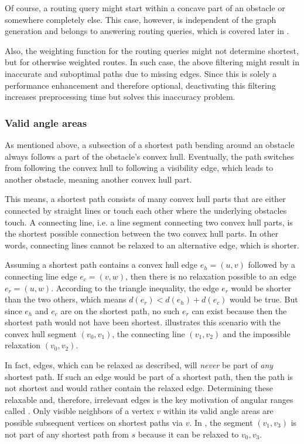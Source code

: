 			Of course, a routing query might start within a concave part of an obstacle or somewhere completely else.
			This case, however, is independent of the graph generation and belongs to answering routing queries, which is covered later in .
			
			Also, the weighting function for the routing queries might not determine shortest, but for otherwise weighted routes.
			In such case, the above filtering might result in inaccurate and suboptimal paths due to missing edges.
			Since this is solely a performance enhancement and therefore optional, deactivating this filtering increases preprocessing time but solves this inaccuracy problem.
						
		\subsubsection{Valid angle areas}
		\label{subsubsec:valid-angle-areas}
			
			As mentioned above, a subsection of a shortest path bending around an obstacle always follows a part of the obstacle's convex hull.
			Eventually, the path switches from following the convex hull to following a visibility edge, which leads to another obstacle, meaning another convex hull part.
			
			This means, a shortest path consists of many convex hull parts that are either connected by straight lines or touch each other where the underlying obstacles touch.
			A connecting line, i.e. a line segment connecting two convex hull parts, is the shortest possible connection between the two convex hull parts.
			In other words, connecting lines cannot be relaxed to an alternative edge, which is shorter.
			
			Assuming a shortest path contains a convex hull edge $e_h=(u, v)$ followed by a connecting line edge $e_c=(v, w)$, then there is no relaxation possible to an edge $e_r=(u, w)$.
			According to the triangle inequality, the edge $e_r$ would be shorter than the two others, which means $d(e_r) < d(e_h) + d(e_c)$ would be true.
			But since $e_h$ and $e_c$ are on the shortest path, no such $e_r$ can exist because then the shortest path would not have been shortest.
			 illustrates this scenario with the convex hull segment $(v_0, v_1)$, the connecting line $(v_1, v_2)$ and the impossible relaxation $(v_0, v_2)$.
			
			In fact, edges, which can be relaxed as described, will \emph{never} be part of \emph{any} shortest path.
			If such an edge would be part of a shortest path, then the path is not shortest and would rather contain the relaxed edge.
			Determining these relaxable and, therefore, irrelevant edges is the key motivation of angular ranges called .
			Only visible neighbors of a vertex $v$ within its valid angle areas are possible subsequent vertices on shortest paths via $v$.
			In , the segment $(v_1, v_3)$ is not part of any shortest path from $s$ because it can be relaxed to $v_0, v_3$.
			
